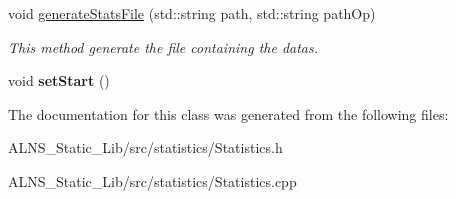 \begin{DoxyCompactItemize}
\item 
\hypertarget{classStatistics_ab02409562fa0f74d240356b7fc4a35d7}{void \hyperlink{classStatistics_ab02409562fa0f74d240356b7fc4a35d7}{generate\-Stats\-File} (std\-::string path, std\-::string path\-Op)}\label{classStatistics_ab02409562fa0f74d240356b7fc4a35d7}

\begin{DoxyCompactList}\small\item\em \-This method generate the file containing the datas. \end{DoxyCompactList}\item 
\hypertarget{classStatistics_af2593852c918bd4110c2ec649b146537}{void {\bfseries set\-Start} ()}\label{classStatistics_af2593852c918bd4110c2ec649b146537}

\end{DoxyCompactItemize}


\-The documentation for this class was generated from the following files\-:\begin{DoxyCompactItemize}
\item 
\-A\-L\-N\-S\-\_\-\-Static\-\_\-\-Lib/src/statistics/\-Statistics.\-h\item 
\-A\-L\-N\-S\-\_\-\-Static\-\_\-\-Lib/src/statistics/\-Statistics.\-cpp\end{DoxyCompactItemize}
